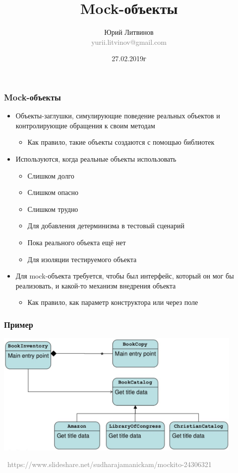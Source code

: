 \documentclass[xetex,mathserif,serif]{beamer}
\title{Mock-объекты}
\author[Юрий Литвинов]{Юрий Литвинов\\\small{\textcolor{gray}{yurii.litvinov@gmail.com}}}
\date{27.02.2019г}
\newcommand{\attribution}[1] {
\vspace{-5mm}\begin{flushright}\begin{scriptsize}\textcolor{gray}{\textcopyright\, #1}\end{scriptsize}\end{flushright}
}
\begin{document}
	\frame{\titlepage}

	\begin{frame}
		\frametitle{Mock-объекты}
		\begin{itemize}
			\item Объекты-заглушки, симулирующие поведение реальных объектов и контролирующие обращения к своим методам
			\begin{itemize}
				\item Как правило, такие объекты создаются с помощью библиотек
			\end{itemize}
			\item Используются, когда реальные объекты использовать
			\begin{itemize}
				\item Слишком долго
				\item Слишком опасно
				\item Слишком трудно
				\item Для добавления детерминизма в тестовый сценарий
				\item Пока реального объекта ещё нет
				\item Для изоляции тестируемого объекта
			\end{itemize}
			\item Для mock-объекта требуется, чтобы был интерфейс, который он мог бы реализовать, и какой-то механизм внедрения объекта
			\begin{itemize}
				\item Как правило, как параметр конструктора или через поле
			\end{itemize}
		\end{itemize}
	\end{frame}

	\begin{frame}
		\frametitle{Пример}
		\begin{center}
			\includegraphics[width=0.9\textwidth]{classesHierarchy.png}
			\attribution{https://www.slideshare.net/sudharajamanickam/mockito-24306321}
		\end{center}
	\end{frame}
\end{document}
